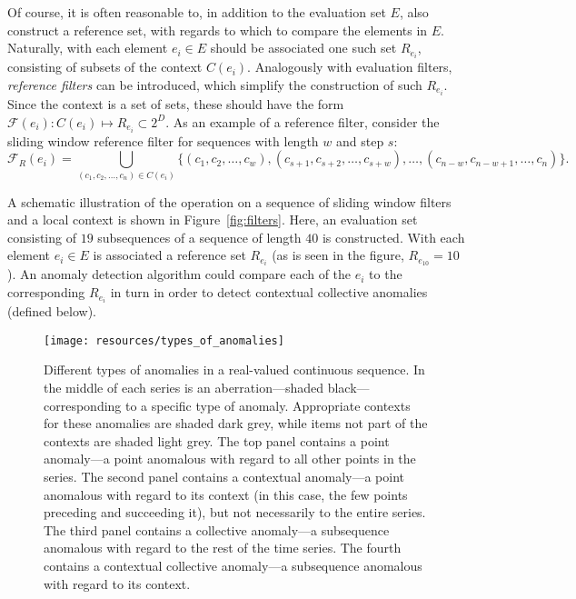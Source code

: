 Of course, it is often reasonable to, in addition to the evaluation set $E$, also construct a reference set, with regards to which to compare the elements in $E$. Naturally, with each element $e_i \in E$ should be associated one such set $R_{e_i}$, consisting of subsets of the context $C(e_i)$. Analogously with evaluation filters, \emph{reference filters} can be introduced, which simplify the construction of such $R_{e_i}$. Since the context is a set of sets, these should have the form $\mathcal{F}(e_i): C(e_i) \mapsto R_{e_i} \subset 2^D$. As an example of a reference filter, consider the sliding window reference filter for sequences with length $w$ and step $s$:
\[
    \mathcal{F}_R(e_i) = \bigcup_{(c_1, c_2, \dots, c_n) \in C(e_i)}\{(c_1, c_2, \dots, c_w), (c_{s+1}, c_{s+2}, \dots, c_{s+w}), \dots, (c_{n-w}, c_{n-w+1}, \dots, c_{n})\}.
\]

A schematic illustration of the operation on a sequence of sliding window filters and a local context is shown in Figure~\ref{fig:filters}. Here, an evaluation set consisting of $19$ subsequences of a sequence of length $40$ is constructed. With each element $e_i \in E$ is associated a reference set $R_{e_i}$ (as is seen in the figure, $R_{e_{10}} = 10$). An anomaly detection algorithm could compare each of the $e_i$ to the corresponding $R_{e_i}$ in turn in order to detect contextual collective anomalies (defined below).

\begin{figure}[htb]
    \begin{center}
        \texttt{[image: resources/types\_of\_anomalies]}
    \end{center}
    \caption{{\small Different types of anomalies in a real-valued continuous sequence. In the middle of each series is an aberration---shaded black---corresponding to a specific type of anomaly. Appropriate contexts for these anomalies are shaded dark grey, while items not part of the contexts are shaded light grey. The top panel contains a point anomaly---a point anomalous with regard to all other points in the series. The second panel contains a contextual anomaly---a point anomalous with regard to its context (in this case, the few points preceding and succeeding it), but not necessarily to the entire series. The third panel contains a collective anomaly---a subsequence anomalous with regard to the rest of the time series. The fourth contains a contextual collective anomaly---a subsequence anomalous with regard to its context.}}
\label{fig:anomaly_types}
\end{figure}

